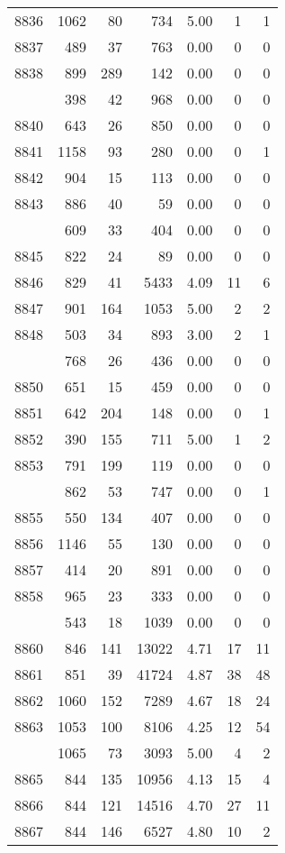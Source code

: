 \documentclass[
]{article}
\begin{document}
\begin{table}
\begin{tabular}[t]{lrrrrrr}
8836 & 1062 & 80 & 734 & 5.00 & 1 & 1\\
8837 & 489 & 37 & 763 & 0.00 & 0 & 0\\
8838 & 899 & 289 & 142 & 0.00 & 0 & 0\\
\addlinespace
8839 & 398 & 42 & 968 & 0.00 & 0 & 0\\
8840 & 643 & 26 & 850 & 0.00 & 0 & 0\\
8841 & 1158 & 93 & 280 & 0.00 & 0 & 1\\
8842 & 904 & 15 & 113 & 0.00 & 0 & 0\\
8843 & 886 & 40 & 59 & 0.00 & 0 & 0\\
\addlinespace
8844 & 609 & 33 & 404 & 0.00 & 0 & 0\\
8845 & 822 & 24 & 89 & 0.00 & 0 & 0\\
8846 & 829 & 41 & 5433 & 4.09 & 11 & 6\\
8847 & 901 & 164 & 1053 & 5.00 & 2 & 2\\
8848 & 503 & 34 & 893 & 3.00 & 2 & 1\\
\addlinespace
8849 & 768 & 26 & 436 & 0.00 & 0 & 0\\
8850 & 651 & 15 & 459 & 0.00 & 0 & 0\\
8851 & 642 & 204 & 148 & 0.00 & 0 & 1\\
8852 & 390 & 155 & 711 & 5.00 & 1 & 2\\
8853 & 791 & 199 & 119 & 0.00 & 0 & 0\\
\addlinespace
8854 & 862 & 53 & 747 & 0.00 & 0 & 1\\
8855 & 550 & 134 & 407 & 0.00 & 0 & 0\\
8856 & 1146 & 55 & 130 & 0.00 & 0 & 0\\
8857 & 414 & 20 & 891 & 0.00 & 0 & 0\\
8858 & 965 & 23 & 333 & 0.00 & 0 & 0\\
\addlinespace
8859 & 543 & 18 & 1039 & 0.00 & 0 & 0\\
8860 & 846 & 141 & 13022 & 4.71 & 17 & 11\\
8861 & 851 & 39 & 41724 & 4.87 & 38 & 48\\
8862 & 1060 & 152 & 7289 & 4.67 & 18 & 24\\
8863 & 1053 & 100 & 8106 & 4.25 & 12 & 54\\
\addlinespace
8864 & 1065 & 73 & 3093 & 5.00 & 4 & 2\\
8865 & 844 & 135 & 10956 & 4.13 & 15 & 4\\
8866 & 844 & 121 & 14516 & 4.70 & 27 & 11\\
8867 & 844 & 146 & 6527 & 4.80 & 10 & 2\\

\end{tabular}
\end{table}
\end{document}
